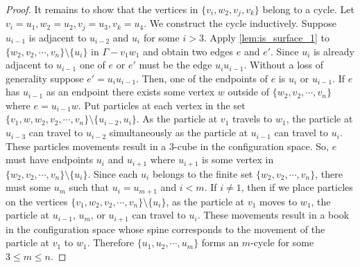 \begin{proof}
    It remains to show that the vertices in \(\{v_i, w_2, v_j, v_k\}\) belong to a cycle.
    Let \(v_i = u_1, w_2 = u_2, v_j = u_3, v_k = u_4\).
    We construct the cycle inductively.
    Suppose \(u_{i - 1}\) is adjacent to \(u_{i - 2}\) and \(u_i\) for some \(i > 3\).
    Apply \ref{lem:is_surface_1} to \(\{w_2, v_2, \cdots, v_n\}\setminus\{u_i\}\) in \(\Gamma - v_1 w_1\) and obtain
    two edges \(e\) and \(e'\).
    Since \(u_i\) is already adjacent to \(u_{i-1}\) one of \(e\) or \(e'\) must
    be the edge \(u_i u_{i -1}\).
    Without a loss of generality suppose \(e' = u_i u_{i-1}\).
    Then, one of the endpoints of \(e\) is \(u_i\) or \(u_{i-1}\).
    If \(e\) has \(u_{i-1}\) as an endpoint there exists
    some vertex \(w\) outside of \(\{w_2, v_2, \cdots, v_n\}\) where \(e = u_{i-1} w\).
    Put particles at each vertex in the set \(\{v_1, w, w_2, v_2, \cdots, v_n\}\setminus\{u_{i-2}, u_i\}\).
    As the particle at \(v_1\) travels to \(w_1\),
    the particle at \(u_{i-3}\) can travel to \(u_{i-2}\) simultaneously as the particle
    at \(u_{i-1}\) can travel to \(u_i\).
    These particles movements result in a \(3\)-cube in the configuration space.
    So, \(e\) must have endpoints \(u_i\) and \(u_{i+1}\) where \(u_{i+1}\) is some vertex in \(\{w_2, v_2, \cdots, v_n\}\setminus\{u_i\}\).
    Since each \(u_i\) belongs to the finite set \(\{w_2, v_2, \cdots, v_n\}\),
    there must some \(u_m\) such that \(u_i = u_{m+1}\) and \(i < m\).
    If \(i \neq 1\), then if we place particles on the vertices
    \(\{v_1, w_2, v_2, \cdots, v_n\}\setminus \{u_i\}\), as the particle at \(v_1\) moves to \(w_1\),
    the particle at \(u_{i - 1}\), \(u_m\), or \(u_{i + 1}\) can travel to \(u_i\).
    These movements result in a book in the configuration space whose spine corresponds to the movement of the particle at \(v_1\) to \(w_1\).
    Therefore \(\{u_1, u_2, \cdots, u_m\}\) forms an \(m\)-cycle for some \(3 \le m \le n\).
\end{proof}

